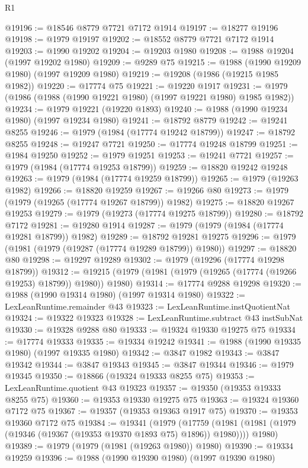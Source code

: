 \begin{lexlean}{R1}
\begin{coremodule}
@19196 := @18546 @8779 @7721 @7172 @1914
@19197 := @18277 @19196
@19198 := @1979 @19197
@19202 := @18552 @8779 @7721 @7172 @1914
@19203 := @1990 @19202
@19204 := @19203 @1980
@19208 := @1988 @19204 (@1997 @19202 @1980)
@19209 := @9289 @75
@19215 := @1988 (@1990 @19209 @1980) (@1997 @19209 @1980)
@19219 := @19208 (@1986 (@19215 @1985 @1982))
@19220 := @17774 @75
@19221 := @19220 @1917
@19231 := @1979 (@1986 (@1988 (@1990 @19221 @1980) (@1997 @19221 @1980) @1985 @1982))
@19234 := @1979 @19221 (@19220 @1893)
@19240 := @1988 (@1990 @19234 @1980) (@1997 @19234 @1980)
@19241 := @18792 @8779
@19242 := @19241 @8255
@19246 := @1979 (@1984 (@17774 @19242 @18799))
@19247 := @18792 @8255
@19248 := @19247 @7721
@19250 := @17774 @19248 @18799
@19251 := @1984 @19250
@19252 := @1979 @19251
@19253 := @19241 @7721
@19257 := @1979 (@1984 (@17774 @19253 @18799))
@19259 := @18820 @19242 @19248
@19263 := @1979 (@1984 (@17774 @19259 @18799))
@19265 := @1979 (@19263 @1982)
@19266 := @18820 @19259
@19267 := @19266 @80
@19273 := @1979 (@1979 (@19265 (@17774 @19267 @18799)) @1982)
@19275 := @18820 @19267 @19253
@19279 := @1979 (@19273 (@17774 @19275 @18799))
@19280 := @18792 @7172
@19281 := @19280 @1914
@19287 := @1979 (@1979 (@1984 (@17774 @19281 @18799)) @1982)
@19289 := @18792 @19281 @19275
@19296 := @1979 (@1981 (@1979 (@19287 (@17774 @19289 @18799)) @1980))
@19297 := @18820 @80
@19298 := @19297 @19289
@19302 := @1979 (@19296 (@17774 @19298 @18799))
@19312 := @19215 (@1979 (@1981 (@1979 (@19265 (@17774 (@19266 @19253) @18799)) @1980)) @1980)
@19314 := @17774 @9288 @19298
@19320 := @1988 (@1990 @19314 @1980) (@1997 @19314 @1980)
@19322 := LexLeanRuntime.remainder @43
@19323 := LexLeanRuntime.instQuotientNat
@19324 := @19322 @19323
@19328 := LexLeanRuntime.subtract @43 instSubNat
@19330 := @19328 @9288 @80
@19333 := @19324 @19330 @19275 @75
@19334 := @17774 @19333
@19335 := @19334 @19242
@19341 := @1988 (@1990 @19335 @1980) (@1997 @19335 @1980)
@19342 := @3847 @1982
@19343 := @3847 @19342
@19344 := @3847 @19343
@19345 := @3847 @19344
@19346 := @1979 @19345
@19350 := @18866 (@19324 @19333 @8255 @75)
@19353 := LexLeanRuntime.quotient @43 @19323
@19357 := @19350 (@19353 @19333 @8255 @75)
@19360 := @19353 @19330 @19275 @75
@19363 := @19324 @19360 @7172 @75
@19367 := @19357 (@19353 @19363 @1917 @75)
@19370 := @19353 @19360 @7172 @75
@19384 := @19341
    (@1979
      (@17759 (@1981 (@1981 (@1979 (@19346 (@19367 (@19353 @19370 @1893 @75) @1896)) @1980))))
      @1980)
@19389 := @1979 (@1979 (@1981 (@19263 @1980)) @1980)
@19390 := @19334 @19259
@19396 := @1988 (@1990 @19390 @1980) (@1997 @19390 @1980)

\end{coremodule}
\end{lexlean}
